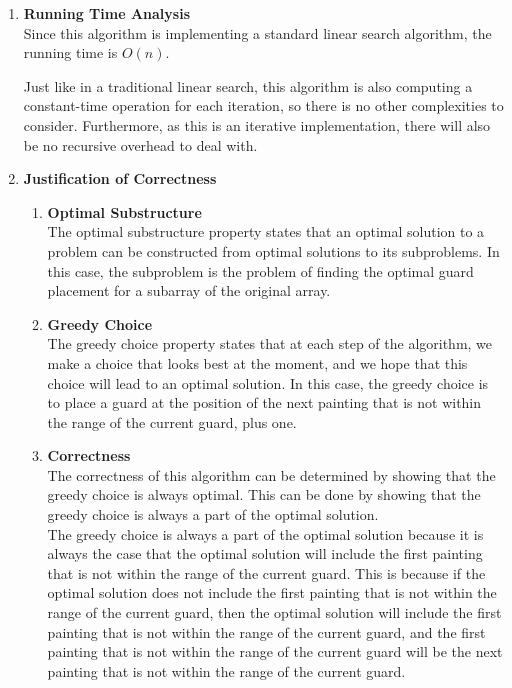 \documentclass{report}
\begin{document}
\begin{enumerate}
    \item \textbf{Running Time Analysis} \\

      Since this algorithm is implementing a standard linear search algorithm, the running time is $O(n)$. 

      \begin{note}
              Just like in a traditional linear search, this algorithm is also computing a constant-time operation for each iteration, so there is no other complexities to consider. Furthermore, as this is an iterative implementation, there will also be no recursive overhead to deal with. \\
      \end{note}

    \item \textbf{Justification of Correctness} \\

    \begin{enumerate}
      \item \textbf{Optimal Substructure} \\

      The optimal substructure property states that an optimal solution to a problem can be constructed from optimal solutions to its subproblems. In this case, the subproblem is the problem of finding the optimal guard placement for a subarray of the original array. \\

      \item \textbf{Greedy Choice} \\

      The greedy choice property states that at each step of the algorithm, we make a choice that looks best at the moment, and we hope that this choice will lead to an optimal solution. In this case, the greedy choice is to place a guard at the position of the next painting that is not within the range of the current guard, plus one. \\

      \item \textbf{Correctness} \\

      The correctness of this algorithm can be determined by showing that the greedy choice is always optimal. This can be done by showing that the greedy choice is always a part of the optimal solution. \\

      The greedy choice is always a part of the optimal solution because it is always the case that the optimal solution will include the first painting that is not within the range of the current guard. This is because if the optimal solution does not include the first painting that is not within the range of the current guard, then the optimal solution will include the first painting that is not within the range of the current guard, and the first painting that is not within the range of the current guard will be the next painting that is not within the range of the current guard. \\


\end{enumerate}
\end{enumerate}
\end{document}

